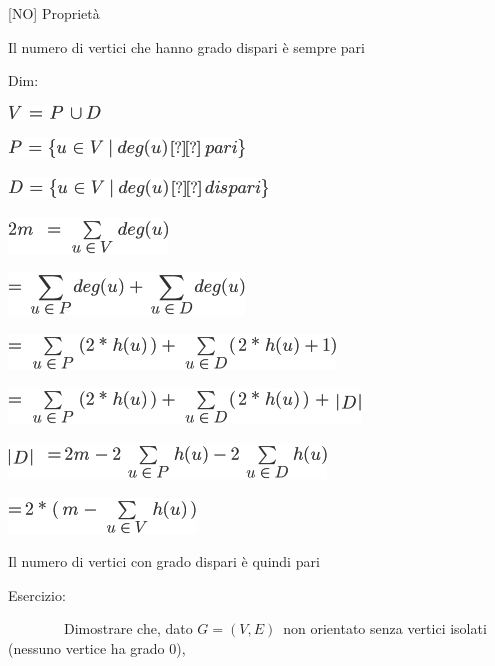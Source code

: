 \documentclass{article}
\begin{document}
{{[}NO{]} Proprietà}

{Il numero di vertici che hanno grado dispari è sempre pari}

{Dim: }

\includegraphics{images/image366.png}

\includegraphics{images/image367.png}

\includegraphics{images/image368.png}

{}

\includegraphics{images/image369.png}

\includegraphics{images/image370.png}{~}

\includegraphics{images/image371.png}{~}

\includegraphics{images/image372.png}{~}

{}

\includegraphics{images/image373.png}

\includegraphics{images/image374.png}{~}

{Il numero di vertici con grado dispari è quindi pari}

{}

{Esercizio}{: }

{~~~~~~~~Dimostrare che, dato
}$G=(V,E)${~non orientato senza vertici
isolati (nessuno vertice ha grado 0),}
\end{document}
